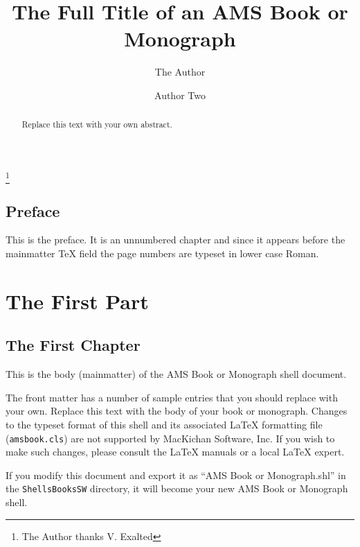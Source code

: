 \documentclass{amsbook}
\theoremstyle{plain}
\numberwithin{equation}{chapter}
\begin{document}
\frontmatter
\title[Short Title]{The Full Title of an AMS Book or Monograph}
\author[A. U. Thor]{The Author}
\address[A. U. Thor]{Author address line 1\\
Author address line 2}
\thanks{The Author thanks V. Exalted}
\author{Author Two}

\begin{abstract}
Replace this text with your own abstract.
\end{abstract}

\maketitle
\tableofcontents

\chapter*{Preface}

This is the preface. It is an unnumbered chapter and since it appears
before the mainmatter TeX field the page numbers are typeset in lower
case Roman.

\mainmatter

\part{The First Part}

\chapter{The First Chapter}

This is the body (mainmatter) of the AMS Book or Monograph shell document.

The front matter has a number of sample entries that you should replace with
your own. Replace this text with the body of your book or monograph. Changes
to the typeset format of this shell and its associated \LaTeX{} formatting
file (\texttt{amsbook.cls}) are not supported by MacKichan Software, Inc. If
you wish to make such changes, please consult the \LaTeX{} manuals or a
local \LaTeX{} expert.

If you modify this document and export it as ``AMS Book or Monograph.shl'' in
the \texttt{Shells\TEXTsymbol{\backslash}Books\TEXTsymbol{\backslash}SW}
directory, it will become your new AMS Book or Monograph shell.
\end{document}
